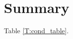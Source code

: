 \documentclass[aps,prb,twocolumn,superscriptaddress,footinbib,amsmath,amssymb,floatfix]{revtex4}
\begin{document}
\section{\label{S:Lifetimes}Summary}

Table \ref{T:cond_table}.



\clearpage


\end{document}
